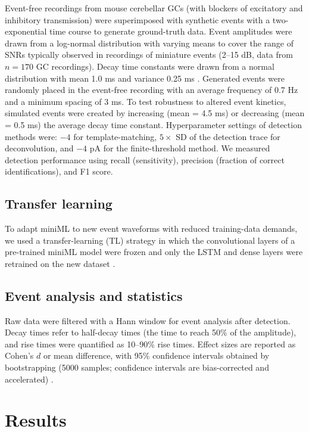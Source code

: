 \documentclass[9pt,lineno]{article}
\begin{document}
Event-free recordings from mouse cerebellar GCs (with blockers of excitatory and inhibitory transmission) were superimposed with synthetic events with a two-exponential time course to generate ground-truth data. Event amplitudes were drawn from a log-normal distribution with varying means to cover the range of SNRs typically observed in recordings of miniature events (2--15 dB, data from $n = 170$ GC recordings). Decay time constants were drawn from a normal distribution with mean 1.0 ms and variance 0.25 ms \citep{Delvendahl2019}. Generated events were randomly placed in the event-free recording with an average frequency of 0.7 Hz and a minimum spacing of 3 ms. To test robustness to altered event kinetics, simulated events were created by increasing (mean = 4.5 ms) or decreasing (mean = 0.5 ms) the average decay time constant. Hyperparameter settings of detection methods were: $-4$ for template-matching, $5\times$ SD of the detection trace for deconvolution, and $-4$ pA for the finite-threshold method. We measured detection performance using recall (sensitivity), precision (fraction of correct identifications), and F1 score.

\subsection{Transfer learning}

To adapt miniML to new event waveforms with reduced training-data demands, we used a transfer-learning (TL) strategy in which the convolutional layers of a pre-trained miniML model were frozen and only the LSTM and dense layers were retrained on the new dataset \citep{Caruana1994,Theodoris2023,Yosinski2014}.

\subsection{Event analysis and statistics}

Raw data were filtered with a Hann window for event analysis after detection. Decay times refer to half-decay times (the time to reach 50\% of the amplitude), and rise times were quantified as 10--90\% rise times. Effect sizes are reported as Cohen's $d$ or mean difference, with 95\% confidence intervals obtained by bootstrapping (5000 samples; confidence intervals are bias-corrected and accelerated) \citep{Ho2019}.

\section{Results}
\end{document}
